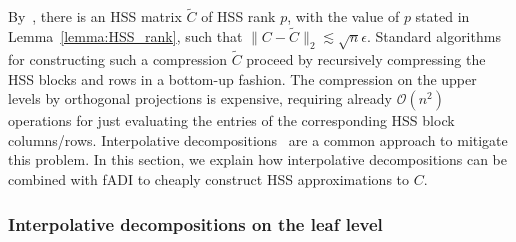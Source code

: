 \documentclass[final,reqno,onefignum,onetabnum]{siamart190516}
\begin{document}
By~\cite[Thm. 4.7]{KMR2019}, there is an HSS matrix
$\widetilde C$ of HSS rank $p$, with the value of $p$ stated in Lemma~\ref{lemma:HSS_rank}, such that
$\|C- \widetilde C\|_2 \lesssim \sqrt{n} \epsilon$. Standard algorithms~\cite{xia2010fast} for constructing such a compression $\widetilde C$ proceed by recursively compressing the HSS blocks and rows in a bottom-up fashion. The compression on the upper levels by orthogonal projections is expensive, requiring already $\mathcal O(n^2)$ operations for just evaluating the entries of the corresponding HSS block columns/rows. Interpolative decompositions~\cite{cheng2005compression,martinsson2011fast, xia2012superfast} are a common approach to mitigate this problem. In this section, we explain how interpolative decompositions can be combined with fADI to cheaply construct HSS approximations to $C$.

\subsubsection{Interpolative decompositions on the leaf level}  \label{sec:leafinterpolation}
\end{document}
